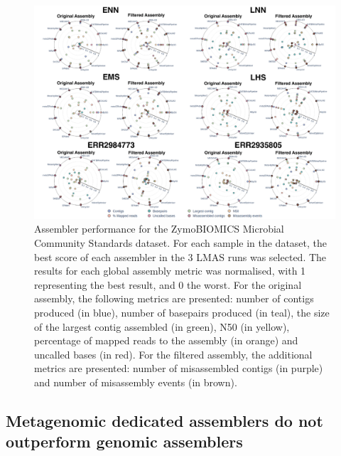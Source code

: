 \begin{figure}[h!]
\centering
\includegraphics[width=\textwidth]{figures/chapter 5/Figure 4.pdf}
\caption{Assembler performance for the ZymoBIOMICS Microbial Community Standards dataset. For each sample in the dataset, the best score of each assembler in the 3 LMAS runs was selected. The results for each global assembly metric was normalised, with 1 representing the best result, and 0 the worst. For the original assembly, the following metrics are presented: number of contigs produced (in blue), number of basepairs produced (in teal), the size of the largest contig assembled (in green), N50 (in yellow), percentage of mapped reads to the assembly (in orange) and uncalled bases (in red).  For the filtered assembly, the additional metrics are presented: number of misassembled contigs (in purple) and number of misassembly events (in brown). }
\label{fig:chap5_figure4}
\end{figure}

\subsection{Metagenomic dedicated assemblers do not outperform genomic assemblers}

